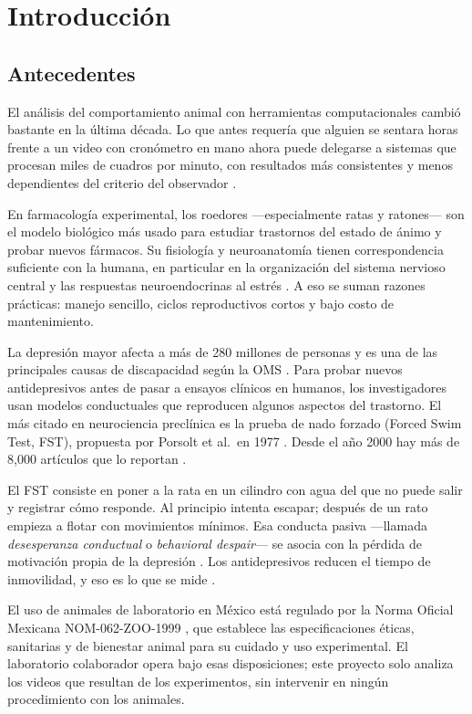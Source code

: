 \chapter{Introducción}

\section{Antecedentes}

El análisis del comportamiento animal con herramientas computacionales cambió bastante
en la última década. Lo que antes requería que alguien se sentara horas frente a un
video con cronómetro en mano ahora puede delegarse a sistemas que procesan miles de
cuadros por minuto, con resultados más consistentes y menos dependientes del criterio
del observador \cite{armario2021,della_valle2025}.

En farmacología experimental, los roedores ---especialmente ratas y ratones--- son el
modelo biológico más usado para estudiar trastornos del estado de ánimo y probar nuevos
fármacos. Su fisiología y neuroanatomía tienen correspondencia suficiente con la humana,
en particular en la organización del sistema nervioso central y las respuestas
neuroendocrinas al estrés \cite{armario2021}. A eso se suman razones prácticas: manejo
sencillo, ciclos reproductivos cortos y bajo costo de mantenimiento.

La depresión mayor afecta a más de 280 millones de personas y es una de las principales
causas de discapacidad según la OMS \cite{who_depression_2025}. Para probar nuevos
antidepresivos antes de pasar a ensayos clínicos en humanos, los investigadores usan
modelos conductuales que reproducen algunos aspectos del trastorno. El más citado en
neurociencia preclínica es la prueba de nado forzado (Forced Swim Test, FST), propuesta
por Porsolt et al.\ en 1977 \cite{porsolt1977}. Desde el año 2000 hay más de
8{,}000 artículos que lo reportan \cite{della_valle2025}.

El FST consiste en poner a la rata en un cilindro con agua del que no puede salir y
registrar cómo responde. Al principio intenta escapar; después de un rato empieza a
flotar con movimientos mínimos. Esa conducta pasiva ---llamada \textit{desesperanza
conductual} o \textit{behavioral despair}--- se asocia con la pérdida de motivación
propia de la depresión \cite{armario2021}. Los antidepresivos reducen el tiempo de
inmovilidad, y eso es lo que se mide \cite{slattery2012,cryan2005}.

El uso de animales de laboratorio en México está regulado por la Norma Oficial Mexicana
NOM-062-ZOO-1999 \cite{nom062}, que establece las especificaciones éticas, sanitarias
y de bienestar animal para su cuidado y uso experimental. El laboratorio colaborador
opera bajo esas disposiciones; este proyecto solo analiza los videos que resultan de
los experimentos, sin intervenir en ningún procedimiento con los animales.

